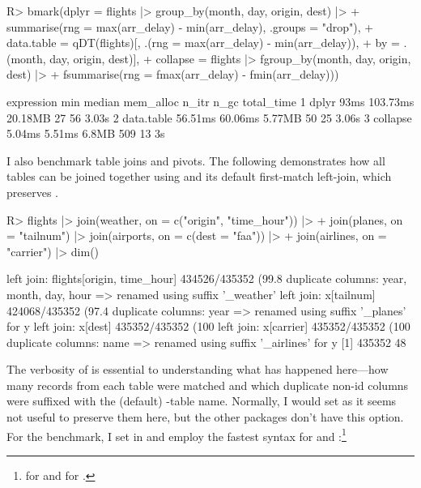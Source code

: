 \documentclass[nojss]{jss} %
\newcommand{\fct}[1]{\code{#1()}}
\begin{document}
%
\begin{Schunk}
\begin{Sinput}
R> bmark(dplyr = flights |> group_by(month, day, origin, dest) |>
+      summarise(rng = max(arr_delay) - min(arr_delay), .groups = "drop"),
+    data.table = qDT(flights)[, .(rng = max(arr_delay) - min(arr_delay)),
+                              by = .(month, day, origin, dest)],
+    collapse = flights |> fgroup_by(month, day, origin, dest) |>
+      fsummarise(rng = fmax(arr_delay) - fmin(arr_delay)))
\end{Sinput}
\begin{Soutput}
  expression     min   median mem_alloc n_itr n_gc total_time
1      dplyr    93ms 103.73ms   20.18MB    27   56      3.03s
2 data.table 56.51ms  60.06ms    5.77MB    50   25      3.06s
3   collapse  5.04ms   5.51ms     6.8MB   509   13         3s
\end{Soutput}
\end{Schunk}
%
I also benchmark table joins and pivots. The following demonstrates how all tables can be joined together using  and its default first-match left-join, which preserves .
%
\begin{Code}
R> flights |> join(weather, on = c("origin", "time_hour")) |>
+    join(planes, on = "tailnum") |> join(airports, on = c(dest = "faa")) |>
+    join(airlines, on = "carrier") |> dim()
\end{Code}
\begin{Schunk}
\begin{Soutput}
left join: flights[origin, time_hour] 434526/435352 (99.8%) <21.94:1st> weat
duplicate columns: year, month, day, hour => renamed using suffix '_weather'
left join: x[tailnum] 424068/435352 (97.4%) <87.62:1st> planes[tailnum] 4840
duplicate columns: year => renamed using suffix '_planes' for y
left join: x[dest] 435352/435352 (100%) <3689.42:1st> airports[faa] 118/1255
left join: x[carrier] 435352/435352 (100%) <31096.57:1st> airlines[carrier] 
duplicate columns: name => renamed using suffix '_airlines' for y
[1] 435352     48
\end{Soutput}
\end{Schunk}
%
The verbosity of \fct{join} is essential to understanding what has happened here---how many records from each table were matched and which duplicate non-id columns were suffixed with the (default) -table name. Normally, I would set  as it seems not useful to preserve them here, but the other packages don't have this option. For the benchmark, I set  in  and employ the fastest syntax for  and :\footnote{ for  and  for .}
\end{document}
